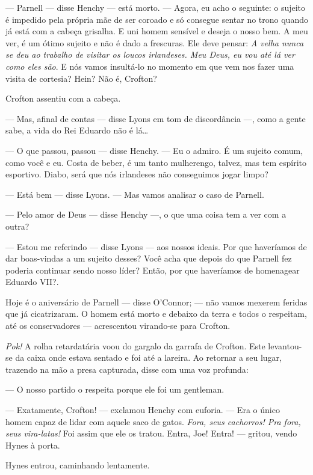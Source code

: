 --- Parnell --- disse Henchy --- está morto. --- Agora, eu acho o
seguinte: o sujeito é impedido pela própria mãe de ser coroado e só
consegue sentar no trono quando já está com a cabeça grisalha. E uni
homem sensível e deseja o nosso bem. A meu ver, é um ótimo sujeito e
não é dado a frescuras. Ele deve pensar: \textit{A velha nunca se deu ao
trabalho de visitar os loucos irlandeses. Meu Deus, eu vou até lá ver
como eles são}. E nós vamos insultá-lo no momento em que vem nos fazer
uma visita de cortesia? Hein? Não é, Crofton?

Crofton assentiu com a cabeça.

--- Mas, afinal de contas --- disse Lyons em tom de discordância
---, como a gente sabe, a vida do Rei Eduardo não é lá\ldots{}

--- O que passou, passou --- disse Henchy. --- Eu o admiro. É um
sujeito comum, como você e eu. Costa de beber, é um tanto mulherengo,
talvez, mas tem espírito esportivo. Diabo, será que nós irlandeses não
conseguimos jogar limpo?

--- Está bem --- disse Lyons. --- Mas vamos analisar o caso de
Parnell.

--- Pelo amor de Deus --- disse Henchy ---, o que uma coisa tem a ver
com a outra?

--- Estou me referindo --- disse Lyons --- aos nossos ideais. Por que
haveríamos de dar boas-vindas a um sujeito desses? Você acha que
depois do que Parnell fez poderia continuar sendo nosso líder? Então,
por que haveríamos de homenagear Eduardo VII?.

Hoje é o aniversário de Parnell --- disse O'Connor; --- não vamos
mexerem feridas que já cicatrizaram. O homem está morto e debaixo da
terra e todos o respeitam, até os conservadores --- acrescentou
virando-se para Crofton.

\textit{Pok!} A rolha retardatária voou do gargalo da garrafa de Crofton.
Este levantou-se da caixa onde estava sentado e foi até a lareira. Ao
retornar a seu lugar, trazendo na mão a presa capturada, disse
com uma voz profunda:

--- O nosso partido o respeita porque ele foi um gentleman.

--- Exatamente, Crofton! --- exclamou Henchy com euforia. --- Era o
único homem capaz de lidar com aquele saco de gatos. \textit{Fora, seus
cachorros! Pra fora, seus vira-latas!} Foi assim que ele os tratou.
Entra, Joe! Entra! --- gritou, vendo Hynes à porta.

Hynes entrou, caminhando lentamente.

